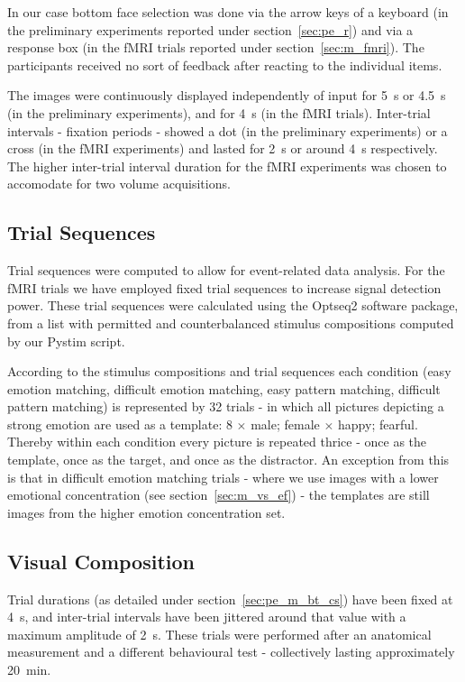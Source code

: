 	In our case bottom face selection was done via the arrow keys of a keyboard (in the preliminary experiments reported under section~\ref{sec:pe_r}) and via a response box (in the fMRI trials reported under section~\ref{sec:m_fmri}).
	The participants received no sort of feedback after reacting to the individual items.
	
	The images were continuously displayed independently of input for \SI{5}{\second} or \SI{4.5}{\second} (in the preliminary experiments), and for \SI{4}{\second} (in the fMRI trials).
	Inter-trial intervals - fixation periods - showed a dot (in the preliminary experiments) or a cross (in the fMRI experiments) and lasted for \SI{2}{\second} or around \SI{4}{\second} respectively.
	The higher inter-trial interval duration for the fMRI experiments was chosen to accomodate for two volume acquisitions.
	\subsection{Trial Sequences}
	    Trial sequences were computed to allow for event-related data analysis.
	    For the fMRI trials we have employed fixed trial sequences to increase signal detection power.
	    These trial sequences were calculated using the Optseq2 \citep{optseq} software package, from a list with permitted and counterbalanced stimulus compositions computed by our Pystim \citep{pystim} script.
	    
	    According to the stimulus compositions and trial sequences each condition (easy emotion matching, difficult emotion matching, easy pattern matching, difficult pattern matching) is represented by 32 trials - in which all pictures depicting a strong emotion are used as a template: 8 $\times$ {male; female} $\times$ {happy; fearful}.
	    Thereby within each condition every picture is repeated thrice - once as the template, once as the target, and once as the distractor.
	    An exception from this is that in difficult emotion matching trials - where we use images with a lower emotional concentration (see section~\ref{sec:m_vs_ef}) - the templates are still images from the higher emotion concentration set.
	\subsection{Visual Composition}	
	    Trial durations (as detailed under section~\ref{sec:pe_m_bt_cs}) have been fixed at \SI{4}{\second}, and inter-trial intervals have been jittered around that value with a maximum amplitude of \SI{2}{\second}.
	    These trials were performed after an anatomical measurement and a different behavioural test - collectively lasting approximately \SI{20}{\minute}.
	    
